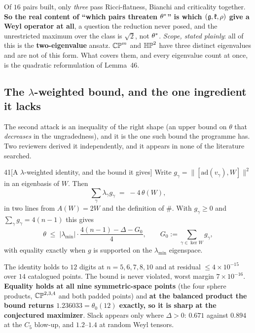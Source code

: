 Of $16$ pairs built, only \emph{three} pass Ricci-flatness, Bianchi and criticality together. \textbf{So the real content of ``which pairs threaten $\theta^{*}$'' is which $(\mathfrak g,\mathfrak{k},\rho)$ give a Weyl operator at all}, a question the reduction never posed, and the unrestricted maximum over the class is $\sqrt2$, not $\theta^{*}$. \emph{Scope, stated plainly}: all of this is the \textbf{two-eigenvalue} ansatz. $\mathbb{CP}^m$ and $\mathbb{HP}^2$ have three distinct eigenvalues and are not of this form. What covers them, and every eigenvalue count at once, is the quadratic reformulation of Lemma~46.

\subsection{The $\lambda$-weighted bound, and the one ingredient it lacks}\label{sec:lambdabound}

The second attack is an inequality of the right shape (an upper bound on $\theta$ that \emph{decreases} in the ungradedness), and it is the one such bound the programme has. Two reviewers derived it independently, and it appears in none of the literature searched.

\begin{Lem}{41}[A $\lambda$-weighted identity, and the bound it gives]
Write $g_\gamma=\lVert[\mathrm{ad}(v_\gamma),W]\rVert^2$ in an eigenbasis of $W$. Then
\[
\sum_\gamma\lambda_\gamma g_\gamma\;=\;-4\,\theta(W),
\]
in two lines from $A(W)=2W$ and the definition of $\#$. With $g_\gamma\ge0$ and $\sum_\gamma g_\gamma=4(n-1)$ this gives
\[
\theta\;\le\;|\lambda_{\min}|\cdot\frac{4(n-1)-\Delta-G_0}{4},\qquad G_0:=\sum_{\gamma\in\ker W}g_\gamma ,
\]
with equality exactly when $g$ is supported on the $\lambda_{\min}$ eigenspace.
\end{Lem}


\begin{certificate}
The identity holds to $12$ digits at $n=5,6,7,8,10$ and at residual $\le4\times10^{-15}$ over $14$ catalogued points. The bound is never violated, worst margin $7\times10^{-16}$. \textbf{Equality holds at all nine symmetric-space points} (the four sphere products, $\mathbb{CP}^{2,3,4}$ and both padded points) and \textbf{at the balanced product the bound returns $1.236033=\theta_0(12)$ exactly, so it is sharp at the conjectured maximizer}. Slack appears only where $\Delta>0$: $0.671$ against $0.894$ at the $C_5$ blow-up, and $1.2$--$1.4$ at random Weyl tensors.
\end{certificate}


